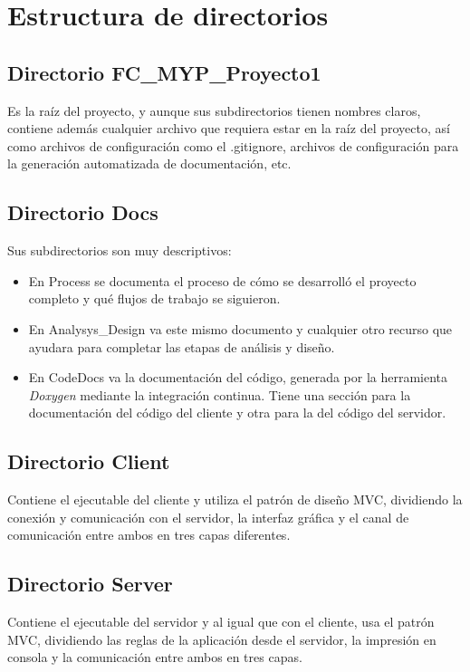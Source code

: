 \section{Estructura de directorios}

\vspace{2mm}

\subsection{Directorio {\ttfamily FC\_MYP\_Proyecto1}}
Es la raíz del proyecto, y aunque sus subdirectorios tienen nombres claros, contiene además cualquier archivo que requiera estar en la raíz del proyecto, así como archivos de configuración como el {\ttfamily .gitignore}, archivos de configuración para la generación automatizada de documentación, etc.

\subsection{Directorio {\ttfamily Docs}}
Sus subdirectorios son muy descriptivos:
\begin{itemize}
    \item En {\ttfamily Process} se documenta el proceso de cómo se desarrolló el proyecto completo y qué flujos de trabajo se siguieron.
    \item En {\ttfamily Analysys\_Design} va este mismo documento y cualquier otro recurso que ayudara para completar las etapas de análisis y diseño.
    \item En {\ttfamily CodeDocs} va la documentación del código, generada por la herramienta \textit{Doxygen} mediante la integración continua. Tiene una sección para la documentación del código del cliente y otra para la del código del servidor.
\end{itemize}

\subsection{Directorio {\ttfamily Client}}
Contiene el ejecutable del cliente y utiliza el patrón de diseño MVC, dividiendo la conexión y comunicación con el servidor, la interfaz gráfica y el canal de comunicación entre ambos en tres capas diferentes.

\subsection{Directorio {\ttfamily Server}}
Contiene el ejecutable del servidor y al igual que con el cliente, usa el patrón MVC, dividiendo las reglas de la aplicación desde el servidor, la impresión en consola y la comunicación entre ambos en tres capas.